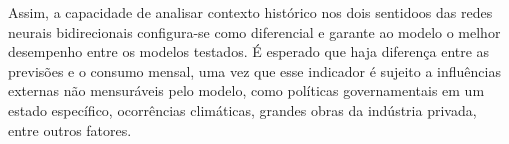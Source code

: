 Assim, a capacidade de analisar contexto histórico nos dois sentidoos das redes
neurais bidirecionais configura-se como diferencial e garante ao modelo o 
melhor desempenho entre os modelos testados. É esperado que haja diferença entre
as previsões e o consumo mensal, uma vez que esse indicador é sujeito a 
influências externas não mensuráveis pelo modelo, como políticas governamentais
em um estado específico, ocorrências climáticas, grandes obras da indústria
privada, entre outros fatores.